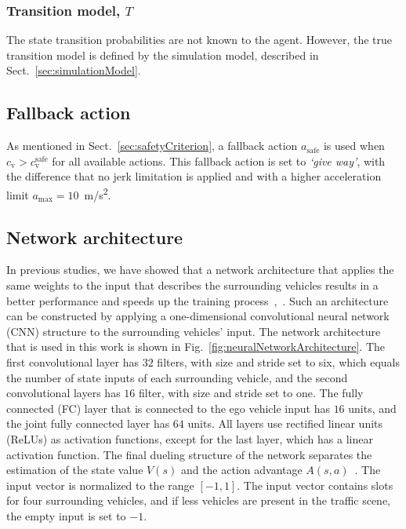 

\subsubsection{Transition model, $T$}
The state transition probabilities are not known to the agent. However, the true transition model is defined by the simulation model, described in Sect.~\ref{sec:simulationModel}.


\subsection{Fallback action}
As mentioned in Sect.~\ref{sec:safetyCriterion}, a fallback action $a_{\mathrm{safe}}$ is used when $c_\mathrm{v}>c_\mathrm{v}^\mathrm{safe}$ for all available actions. This fallback action is set to \textit{`give way'}, with the difference that no jerk limitation is applied and with a higher acceleration limit $a_{\max} = 10$~m/s\textsuperscript{2}.%


\subsection{Network architecture}
In previous studies, we have showed that a network architecture that applies the same weights to the input that describes the surrounding vehicles results in a better performance and speeds up the training process~\cite{Hoel2018},~\cite{Tram2018}. Such an architecture can be constructed by applying a one-dimensional convolutional neural network (CNN) structure to the surrounding vehicles' input. The network architecture that is used in this work is shown in Fig.~\ref{fig:neuralNetworkArchitecture}.
The first convolutional layer has $32$ filters, with size and stride set to six, which equals the number of state inputs of each surrounding vehicle, and the second convolutional layers has $16$ filter, with size and stride set to one. The fully connected (FC) layer that is connected to the ego vehicle input has $16$ units, and the joint fully connected layer has $64$ units. All layers use rectified linear units (ReLUs) as activation functions, except for the last layer, which has a linear activation function.
The final dueling structure of the network separates the estimation of the state value $V(s)$ and the action advantage $A(s,a)$~\cite{Wang2016}.
The input vector is normalized to the range $[-1, 1]$. The input vector contains slots for four surrounding vehicles, and if less vehicles are present in the traffic scene, the empty input is set to $-1$.


